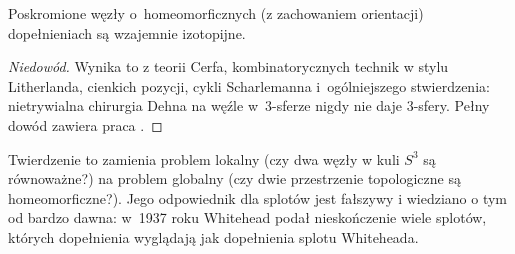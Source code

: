 \begin{theorem}
%
%
%
    Poskromione węzły o~homeomorficznych (z zachowaniem orientacji) dopełnieniach są wzajemnie izotopijne.
\end{theorem}

\begin{proof}[Niedowód]
    Wynika to z teorii Cerfa, kombinatorycznych technik w stylu Litherlanda, cienkich pozycji, cykli Scharlemanna i~ogólniejszego stwierdzenia: nietrywialna chirurgia Dehna na węźle w~3-sferze nigdy nie daje 3-sfery.
%
%
%
    Pełny dowód zawiera praca \cite{gordon89}.
\end{proof}

Twierdzenie to zamienia problem lokalny (czy dwa węzły w kuli $S^3$ są równoważne?) na problem globalny (czy dwie przestrzenie topologiczne są homeomorficzne?).
Jego odpowiednik dla splotów jest fałszywy i wiedziano o tym od bardzo dawna: w~1937 roku Whitehead \cite{whitehead37} podał nieskończenie wiele splotów, których dopełnienia wyglądają jak dopełnienia splotu Whiteheada.
%


